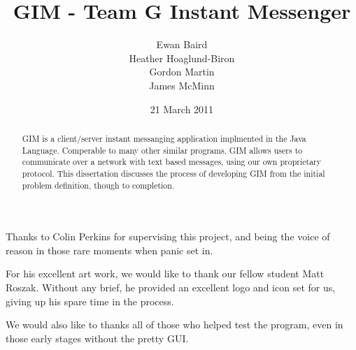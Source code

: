 \documentclass{l3proj}
\begin{document}
\title{GIM - Team G Instant Messenger}
\author{Ewan Baird \\
Heather Hoaglund-Biron \\
Gordon Martin \\
James McMinn}
\date{21 March 2011}
\maketitle
\begin{abstract}

GIM is a client/server instant messanging application implmented in the Java Language. Comperable to many other similar programs, GIM allows users to communicate over a network with text based messages, using our own proprietary protocol. This dissertation discusses the process of developing GIM from the initial problem definition, though to completion.

\end{abstract}

\begin{acknowledgements}

Thanks to Colin Perkins for supervising this project, and being the voice of reason in those rare moments when panic set in.

For his excellent art work, we would like to thank our fellow student Matt Roszak. Without any brief, he provided an excellent logo and icon set for us, giving up his spare time in the process.

We would also like to thanks all of those who helped test the program, even in those early stages without the pretty GUI.

\end{acknowledgements}

\educationalconsent
\tableofcontents

















\end{document}
